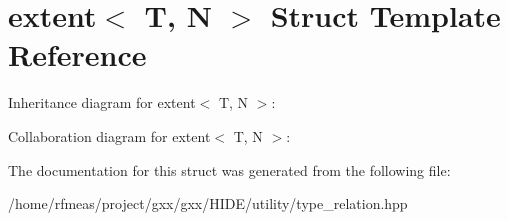 \hypertarget{structextent}{}\section{extent$<$ T, N $>$ Struct Template Reference}
\label{structextent}


Inheritance diagram for extent$<$ T, N $>$\+:


Collaboration diagram for extent$<$ T, N $>$\+:


The documentation for this struct was generated from the following file\+:\begin{DoxyCompactItemize}
\item 
/home/rfmeas/project/gxx/gxx/\+H\+I\+D\+E/utility/type\+\_\+relation.\+hpp\end{DoxyCompactItemize}
